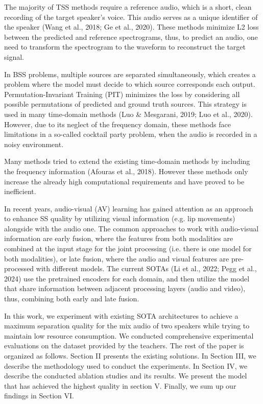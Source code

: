 \documentclass[10pt,conference,compsocconf]{IEEEtran}
\begin{document}
The majority of TSS methods require a reference audio, which is a short, clean recording of the target speaker's voice. This audio serves as a unique identifier of the speaker (Wang et al., 2018\cite{wang2019voicefilter}; Ge et al., 2020\cite{ge2020spexplus}). These methods minimize L2 loss between the predicted and reference spectrograms, thus, to predict an audio, one need to transform the spectrogram to the waveform to reconstruct the target signal.

In BSS problems, multiple sources are separated simultaneously, which creates a problem where the model must decide to which source corresponds each output. Permutation-Invariant Training (PIT)\cite{yu2017permutation} minimizes the loss by considering all possible permutations of predicted and ground truth sources. This strategy is used in many time-domain methods (Luo \& Mesgarani, 2019\cite{luo2018tasnet}; Luo et al., 2020\cite{luo2019convtasnet}). However, due to its neglect of the frequency domain, these methods face limitations in a so-called cocktail party problem, when the audio is recorded in a noisy environment. 

Many methods tried to extend the existing time-domain methods by including the frequency information (Afouras et al., 2018\cite{afouras2018deep}). However these methods only increase the already high computational requirements and have proved to be inefficient.

In recent years, audio-visual (AV) learning has gained attention as an approach to enhance SS quality by utilizing visual information (e.g. lip movements) alongside with the audio one. The common approaches to work with audio-visual information are early fusion, where the features from both modalities are combined at the input stage for the joint processing (i.e. there is one model for both modalities), or late fusion, where the audio and visual features are pre-processed with different models. The current SOTAs (Li et al., 2022; Pegg et al., 2024) use the pretrained encoders for each domain, and then utilize the model that share information between adjacent processing layers (audio and video), thus, combining both early and late fusion.

In this work, we experiment with existing SOTA architectures to achieve a maximum separation quality for the mix audio of two speakers while trying to maintain low resource consumption. We conducted comprehensive experimental evaluations on the dataset provided by the teachers.  The rest of the paper is organized as follows. Section II presents the existing solutions. In Section III, we describe the methodology used to conduct the experiments. In Section IV, we describe the conducted ablation studies and its results. We present the model that has achieved the highest quality in section V. Finally, we sum up our findings in Section VI.
\end{document}
